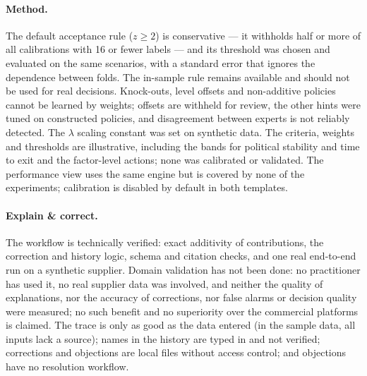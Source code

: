 \documentclass[10pt,twocolumn,a4paper]{article}
\begin{document}
\paragraph{Method.} The default acceptance rule ($z\geq2$) is conservative --- it
withholds half or more of all calibrations with 16 or fewer labels --- and its threshold
was chosen and evaluated on the same scenarios, with a standard error that ignores the
dependence between folds. The in-sample rule remains available and should not be used for
real decisions. Knock-outs, level offsets and non-additive policies cannot be learned by
weights; offsets are withheld for review, the other hints were tuned on constructed
policies, and disagreement between experts is not reliably detected. The $\lambda$
scaling constant was set on synthetic data. The criteria, weights and thresholds are
illustrative, including the bands for political stability and time to exit and the
factor-level actions; none was calibrated or validated. The performance view uses the same
engine but is covered by none of the experiments; calibration is disabled by default in
both templates.

\paragraph{Explain \& correct.} The workflow is technically verified: exact additivity of
contributions, the correction and history logic, schema and citation checks, and one real
end-to-end run on a synthetic supplier. Domain validation has not been done: no practitioner
has used it, no real supplier data was involved, and neither the quality of explanations, nor
the accuracy of corrections, nor false alarms or decision quality were measured; no such benefit
and no superiority over the commercial platforms is claimed. The trace is only as good as the
data entered (in the sample data, all inputs lack a source); names in the history are typed in
and not verified; corrections and objections are local files without access control; and
objections have no resolution workflow.
\end{document}
